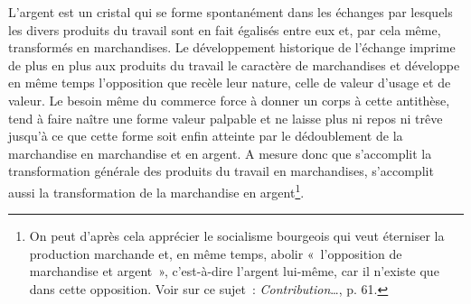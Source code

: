 \documentclass[french,twoside]{book} %
\begin{document}
\noindent L’argent est un cristal qui se forme spontanément dans les échanges par lesquels les divers produits du travail sont en fait égalisés entre eux et, par cela même, transformés en marchandises. Le développement historique de l’échange imprime de plus en plus aux produits du travail le caractère de marchandises et développe en même temps l’opposition que recèle leur nature, celle de valeur d’usage et de valeur. Le besoin même du commerce force à donner un corps à cette antithèse, tend à faire naître une forme valeur palpable et ne laisse plus ni repos ni trêve jusqu’à ce que cette forme soit enfin atteinte par le dédoublement de la marchandise en marchandise et en argent. A mesure donc que s’accomplit la transformation générale des produits du travail en marchandises, s’accomplit aussi la transformation de la marchandise en argent\footnote{On peut d’après cela apprécier le socialisme bourgeois qui veut éterniser la production marchande et, en même temps, abolir « l’opposition de marchandise et argent », c’est-à-dire l’argent lui-même, car il n’existe que dans cette opposition. Voir sur ce sujet : \emph{Contribution}…, p. 61.}.\par
\end{document}
